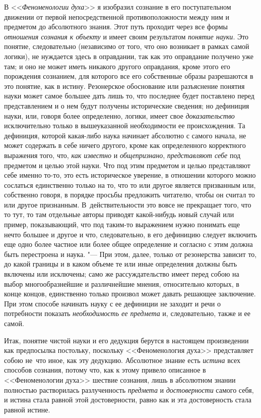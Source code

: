 В <<{\em Феноменологии духа}>> я изобразил сознание в его
поступательном движении от первой непосредственной противоположности между
ним и предметом до абсолютного знания. Этот путь проходит через все формы
{\em отношения сознания к объекту} и имеет своим
результатом {\em понятие науки}. Это понятие,
следовательно (независимо от того, что оно возникает в рамках самой
логики), не нуждается здесь в оправдании, так как это оправдание получено
уже там; и оно не может иметь никакого другого оправдания, кроме этого его
порождения сознанием, для которого все его собственные образы разрешаются в
это понятие, как в истину. Резонерское обоснование или разъяснение
понятия науки может самое большее дать лишь то, что последнее будет
поставлено перед представлением и о нем будут получены исторические
сведения; но дефиниция науки, или, говоря более определенно, логики, имеет
свое {\em доказательство} исключительно только в
вышеуказанной необходимости ее происхождения. Та дефиниция, которой
какая-либо наука начинает абсолютно с самого начала, не может содержать в
себе ничего другого, кроме как определенного корректного выражения того,
что, {\em как известно} и {\em общепризнано},
{\em представляют себе} под предметом и целью этой
науки. Что под этим предметом и целью представляют себе именно то-то, это
есть историческое уверение, в отношении которого можно сослаться
единственно только на то, что то или другое является призванным или,
собственно говоря, в порядке просьбы предложить читателю, чтобы он считал
то или другое признанным. В~действительности это вовсе не прекращает того,
что то тут, то там отдельные авторы приводят какой-нибудь новый случай или
пример, показывающий, что под таким-то выражением нужно понимать еще нечто
большее и другое и что, следовательно, в его дефиницию следует включить еще
одно более частное или более общее определение и согласно с этим должна
быть перестроена и наука. "--- При этом, далее, только от резонерства
зависит то, до какой границы и в каком объеме те или иные определения
должны быть включены или исключены; само же рассуждательство имеет перед
собою на выбор многообразнейшие и различнейшие мнения, относительно
которых, в конце концов, единственно только произвол может давать решающее
заключение. При этом способе начинать науку с ее дефиниции не заходит и
речи о потребности показать {\em необходимость ее
предмета} и, следовательно, также и ее самой.

Итак, понятие чистой науки и его дедукция берутся в настоящем произведении
как предпосылка постольку, поскольку <<Феноменология духа>> представляет
собою не~что иное, как эту дедукцию. Абсолютное знание есть
{\em истина} всех способов сознания, потому что, как к
этому привело описанное в <<Феноменологии духа>> шествие сознания, лишь в
абсолютном знании полностью растворилась разлученность
{\em предмета} и {\em достоверности} самого себя, и истина стала равной
этой достоверности, равно как и эта достоверность стала равной истине.

